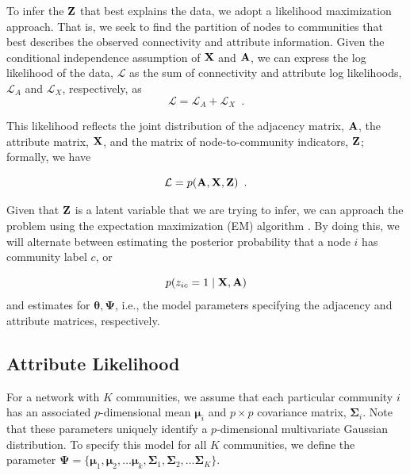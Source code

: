 To infer the ${\bf Z}$ that best explains the data, we adopt a likelihood maximization approach. That is, we seek to find the partition of nodes to communities that best describes the observed connectivity and attribute information.  Given the conditional independence assumption of ${\bf X}$ and ${\bf A}$, we can express the log likelihood of the data, ${\mathcal L}$ as the sum of connectivity and attribute log likelihoods, ${\mathcal L}_{A}$ and ${\mathcal L}_{X}$, respectively,
as
\begin{equation}
\mathcal{L}=\mathcal{L}_{A}+\mathcal{L}_{X}\enspace.
\label{eqn:likelihood_decomposition}
\end{equation}

This likelihood reflects the joint distribution of the adjacency matrix, ${\bf A}$, the attribute matrix, ${\bf X}$, and the matrix of node-to-community indicators, ${\bf Z}$; formally, we have 

\begin{equation}
\mathcal{L}=p({\bf A},{\bf X},{\bf Z})\enspace. 
\end{equation}

Given that ${\bf Z}$ is a latent variable that we are trying to infer, we can approach the problem using the expectation maximization (EM) algorithm \cite{EM}. By doing this, we will alternate between estimating the posterior probability that a node $i$ has community label $c$, or

\begin{equation}
\label{post}
p(z_{ic}=1\mid {\bf X,A})
\end{equation} 
and estimates for ${\boldsymbol \theta, \boldsymbol \Psi}$, i.e., the model parameters specifying the adjacency and attribute matrices, respectively. 

\subsection{Attribute Likelihood}

For a network with $K$ communities, we assume that each particular community $i$ has an associated $p$-dimensional mean ${\boldsymbol \mu}_{i}$ and $p \times p$ covariance matrix, ${\boldsymbol \Sigma}_{i}$. Note that these parameters uniquely identify a $p$-dimensional multivariate Gaussian distribution. To specify this model for all $K$ communities, we define the parameter ${\boldsymbol \Psi}=\{{\boldsymbol \mu}_{1},{\boldsymbol \mu}_{2},\dots {\boldsymbol \mu}_{k},{\boldsymbol \Sigma}_{1},{\boldsymbol \Sigma}_{2},\dots {\boldsymbol \Sigma}_{K}\}$. 

